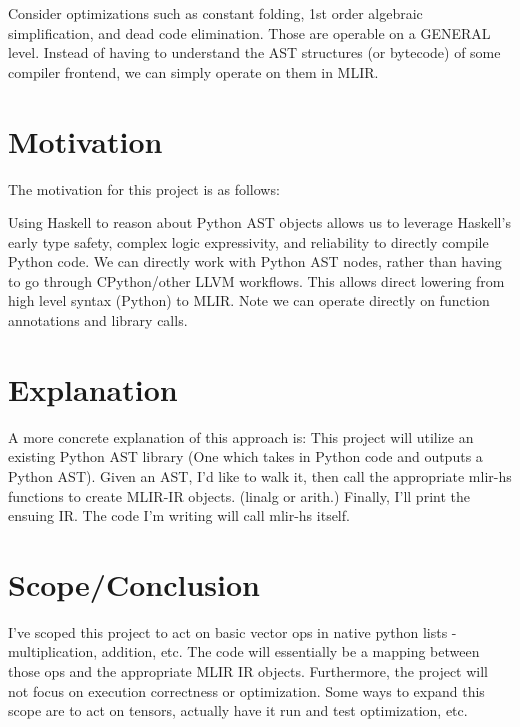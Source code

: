 \documentclass[11pt]{article}
\begin{document}
Consider optimizations such as constant folding, 1st order algebraic simplification, and
dead code elimination. Those are operable on a GENERAL level. Instead of having to
understand the AST structures (or bytecode) of some compiler frontend, we can simply operate on them in MLIR.

\section{Motivation}
The motivation for this project is as follows:

Using Haskell to reason about Python AST objects allows us to leverage
Haskell's early type safety, complex logic expressivity, and reliability to
directly compile Python code.
We can directly work with Python AST nodes, rather than having to go through
CPython/other LLVM workflows. This allows direct lowering from high level syntax (Python)
to MLIR. Note we can operate directly on
function annotations and library calls.

\section{Explanation}
A more concrete explanation of this approach is:
This project will utilize an existing Python AST library (One which takes in Python code and outputs a Python AST).
Given an AST, I'd like to walk it, then call the appropriate mlir-hs functions to
create MLIR-IR objects. (linalg or arith.) 
Finally, I'll print the ensuing IR. The code I'm writing will call mlir-hs itself.

\section{Scope/Conclusion}
I've scoped this project to act on basic vector ops in native python lists - multiplication, addition, etc.
The code will essentially be a mapping between those ops and the appropriate MLIR IR objects.
Furthermore, the project will not focus on execution correctness or optimization.
Some ways to expand this scope are to act on tensors, actually have it run and test optimization,
etc.
\end{document}
